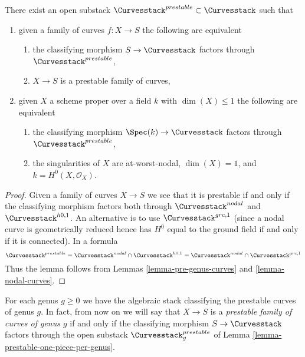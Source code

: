 \begin{lemma}
\label{lemma-prestable-curves}
There exist an open substack $\Curvesstack^{prestable} \subset \Curvesstack$
such that
\begin{enumerate}
\item given a family of curves $f : X \to S$ the following are equivalent
\begin{enumerate}
\item the classifying morphism $S \to \Curvesstack$ factors
through $\Curvesstack^{prestable}$,
\item $X \to S$ is a prestable family of curves,
\end{enumerate}
\item given $X$ a scheme proper over a field $k$ with
$\dim(X) \leq 1$ the following are equivalent
\begin{enumerate}
\item the classifying morphism $\Spec(k) \to \Curvesstack$
factors through $\Curvesstack^{prestable}$,
\item the singularities of $X$ are at-worst-nodal, $\dim(X) = 1$,
and $k = H^0(X, \mathcal{O}_X)$.
\end{enumerate}
\end{enumerate}
\end{lemma}

\begin{proof}
Given a family of curves $X \to S$ we see that it is prestable if
and only if the classifying morphism factors both through
$\Curvesstack^{nodal}$ and $\Curvesstack^{h0, 1}$. An alternative
is to use $\Curvesstack^{grc, 1}$ (since a nodal curve is geometrically
reduced hence has $H^0$ equal to the ground field if and only if
it is connected). In a formula
$$
\Curvesstack^{prestable} =
\Curvesstack^{nodal} \cap \Curvesstack^{h0, 1} =
\Curvesstack^{nodal} \cap \Curvesstack^{grc, 1}
$$
Thus the lemma follows from
Lemmas \ref{lemma-pre-genus-curves} and \ref{lemma-nodal-curves}.
\end{proof}

\noindent
For each genus $g \geq 0$ we have the algebraic stack classifying
the prestable curves of genus $g$. In fact, from now on we will say
that $X \to S$ is a {\it prestable family of curves of genus $g$}
if and only if the classifying morphism $S \to \Curvesstack$ factors through
the open substack $\Curvesstack^{prestable}_g$ of
Lemma \ref{lemma-prestable-one-piece-per-genus}.

